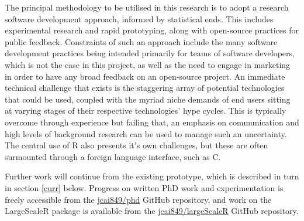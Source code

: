 The principal methodology to be utilised in this research is to adopt a research software development approach, informed by statistical ends\cite{bezroukov1999open}.
This includes experimental research and rapid prototyping, along with open-source practices for public feedback.
Constraints of such an approach include the many software development practices being intended primarily for teams of software developers, which is not the case in this project, as well as the need to engage in marketing in order to have any broad feedback on an open-source project.
An immediate technical challenge that exists is the staggering array of potential technologies that could be used, coupled with the myriad niche demands of end users sitting at varying stages of their respective technologies' hype cycles.
This is typically overcome through experience but failing that, an emphasis on communication and high levels of background research can be used to manage such an uncertainty.
The central use of R also presents it's own challenges, but these are often surmounted through a foreign language interface, such as C\cite{wickham2019advancedr}.

Further work will continue from the existing prototype, which is described in turn in section \ref{curr} below.
Progress on written PhD work and experimentation is freely accessible from the \href{https://github.com/jcai849/phd}{jcai849/phd} GitHub repository, and work on the LargeScaleR package is available from the \href{https://github.com/jcai849/phd}{jcai849/largeScaleR} GitHub repository\cite{cairns2020largescaler}.
